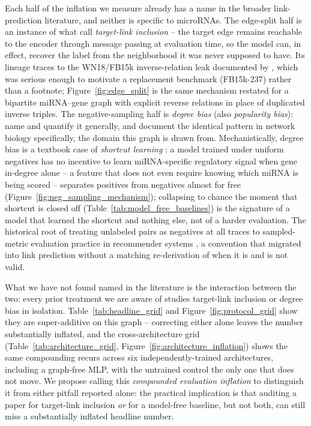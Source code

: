 \documentclass{bmcart}
\begin{document}
Each half of the inflation we measure already has a name in the broader link-prediction
literature, and neither is specific to microRNAs. The edge-split half is an instance of
what \cite{zhu2023pitfalls} call \emph{target-link inclusion} -- the target edge remains
reachable to the encoder through message passing at evaluation time, so the model can, in
effect, recover the label from the neighborhood it was never supposed to have. Its
lineage traces to the WN18/FB15k inverse-relation leak documented by
\cite{toutanova2015observed}, which was serious enough to motivate a replacement
benchmark (FB15k-237) rather than a footnote; Figure~\ref{fig:edge_split} is the same
mechanism restated for a bipartite miRNA--gene graph with explicit reverse relations
in place of duplicated inverse triples. The negative-sampling half is \emph{degree bias}
(also \emph{popularity bias}): \cite{aiyappa2024implicit} name and quantify it generally,
and \cite{yilmaz2025biasaware} document the identical pattern in network biology
specifically, the domain this graph is drawn from. Mechanistically, degree bias is a
textbook case of \emph{shortcut learning} \cite{geirhos2020shortcut}: a model trained
under uniform negatives has no incentive to learn miRNA-specific regulatory signal when
gene in-degree alone -- a feature that does not even require knowing which miRNA is
being scored -- separates positives from negatives almost for free
(Figure~\ref{fig:neg_sampling_mechanism}); collapsing to chance the moment that shortcut
is closed off (Table~\ref{tab:model_free_baselines}) is the signature of a model that
learned the shortcut and nothing else, not of a harder evaluation. The historical root of
treating unlabeled pairs as negatives at all traces to sampled-metric evaluation practice
in recommender systems \cite{krichene2020sampled}, a convention that migrated into link
prediction without a matching re-derivation of when it is and is not valid.

What we have not found named in the literature is the interaction between the two: every
prior treatment we are aware of studies target-link inclusion or degree bias in
isolation. Table~\ref{tab:headline_grid} and Figure~\ref{fig:protocol_grid} show they are
super-additive on this graph -- correcting either alone leaves the number substantially
inflated, and the cross-architecture grid (Table~\ref{tab:architecture_grid},
Figure~\ref{fig:architecture_inflation}) shows the same compounding recurs across six
independently-trained architectures, including a graph-free MLP, with the untrained
control the only one that does not move. We propose calling this \emph{compounded
evaluation inflation} to distinguish it from either pitfall reported alone: the
practical implication is that auditing a paper for target-link inclusion \emph{or} for a
model-free baseline, but not both, can still miss a substantially inflated headline
number.
\end{document}
